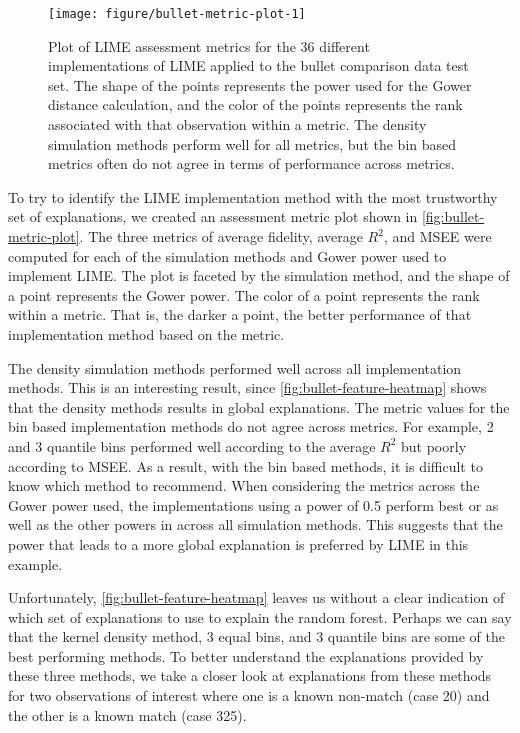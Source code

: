 \documentclass[AMS,STIX2COL]{WileyNJD-v2}\usepackage[]{graphicx}\usepackage[]{color}
\newenvironment{knitrout}{}{} %
\begin{document}
{\begin{figure}[!t]
\begin{knitrout}
\color{fgcolor}
\texttt{[image: figure/bullet-metric-plot-1]} 

\end{knitrout}
\caption{Plot of LIME assessment metrics for the 36 different implementations of LIME applied to the bullet comparison data test set. The shape of the points represents the power used for the Gower distance calculation, and the color of the points represents the rank associated with that observation within a metric. The density simulation methods perform well for all metrics, but the bin based metrics often do not agree in terms of performance across metrics.}
\label{fig:bullet-metric-plot}
\end{figure}

To try to identify the LIME implementation method with the most trustworthy set of explanations, we created an assessment metric plot shown in \autoref{fig:bullet-metric-plot}. The three metrics of average fidelity, average $R^2$, and MSEE were computed for each of the simulation methods and Gower power used to implement LIME. The plot is faceted by the simulation method, and the shape of a point represents the Gower power. The color of a point represents the rank within a metric. That is, the darker a point, the better performance of that implementation method based on the metric.

The density simulation methods performed well across all implementation methods. This is an interesting result, since \autoref{fig:bullet-feature-heatmap} shows that the density methods results in global explanations. The metric values for the bin based implementation methods do not agree across metrics. For example, 2 and 3 quantile bins performed well according to the average $R^2$ but poorly according to MSEE. As a result, with the bin based methods, it is difficult to know which method to recommend. When considering the metrics across the Gower power used, the implementations using a power of 0.5 perform best or as well as the other powers in across all simulation methods. This suggests that the power that leads to a more global explanation is preferred by LIME in this example.

Unfortunately, \autoref{fig:bullet-feature-heatmap} leaves us without a clear indication of which set of explanations to use to explain the random forest. Perhaps we can say that the kernel density method, 3 equal bins, and 3 quantile bins are some of the best performing methods. To better understand the explanations provided by these three methods, we take a closer look at explanations from these methods for two observations of interest where one is a known non-match (case 20) and the other is a known match (case 325).

}
\end{document}
